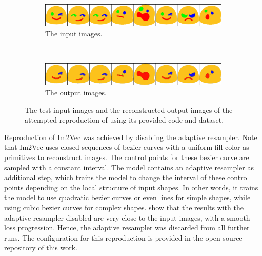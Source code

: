 \begin{figure}
    \centering
    \begin{subfigure}{\textwidth}
        \includegraphics[width=\textwidth]{graphics/work-artifacts/im2vec/110_repro/real_img_VectorVAEnLayers_0397.png}
        \caption{The input images.}
    \end{subfigure} \\
    \begin{subfigure}{\textwidth}
        \includegraphics[width=\textwidth]{graphics/work-artifacts/im2vec/110_repro/recons_VectorVAEnLayers_0397.png}
        \caption{The output images.}
    \end{subfigure}
    \caption{The test input images and the reconstructed output images of the attempted reproduction of \citep{DBLP:conf/cvpr/Reddy21} using its provided code and dataset.}
    \label{fig:110_repro.recons}
\end{figure}

Reproduction of Im2Vec \citep{DBLP:conf/cvpr/Reddy21} was achieved by disabling the adaptive resampler. Note that Im2Vec uses closed sequences of bezier curves with a uniform fill color as primitives to reconstruct images. The control points for these bezier curve are sampled with a constant interval. The model contains an adaptive resampler as additional step, which trains the model to change the interval of these control points depending on the local structure of input shapes. In other words, it trains the model to use quadratic bezier curves or even lines for simple shapes, while using cubic bezier curves for complex shapes.  show that the results with the adaptive resampler disabled are very close to the input images, with a smooth loss progression. Hence, the adaptive resampler was discarded from all further runs. The configuration for this reproduction is provided in the open source repository of this work.

